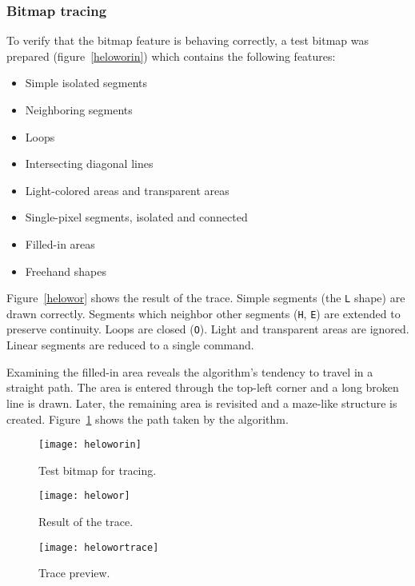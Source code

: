 \subsubsection{Bitmap tracing}

To verify that the bitmap feature is behaving correctly, a test bitmap was
prepared (figure~\ref{heloworin}) which contains the following features:
\begin{itemize}
    \item Simple isolated segments
    \item Neighboring segments
    \item Loops
    \item Intersecting diagonal lines
    \item Light-colored areas and transparent areas
    \item Single-pixel segments, isolated and connected
    \item Filled-in areas
    \item Freehand shapes
\end{itemize}
Figure~\ref{helowor} shows the result of the trace. Simple segments (the
\texttt{L} shape) are drawn correctly. Segments which neighbor other segments
(\texttt{H}, \texttt{E}) are extended to preserve continuity. Loops are closed
(\texttt{O}). Light and transparent areas are ignored. Linear segments are
reduced to a single command.

Examining the filled-in area reveals the algorithm's tendency to travel in a
straight path. The area is entered through the top-left corner and a long broken
line is drawn. Later, the remaining area is revisited and a maze-like structure
is created. Figure~\ref{helowortrace} shows the path taken by the algorithm.

\begin{figure}[ht]
    \begin{minipage}{0.5\textwidth}
        \centering
        \texttt{[image: heloworin]}
        \caption{Test bitmap for tracing.}
        \label{heloworin}
    \end{minipage}\hfill
    \begin{minipage}{0.5\textwidth}
        \centering
        \texttt{[image: helowor]}
        \caption{Result of the trace.}
        \label{helowor}
    \end{minipage}
    \begin{minipage}{0.5\textwidth}
        \centering
        \texttt{[image: helowortrace]}
        \caption{Trace preview.}
        \label{helowortrace}
    \end{minipage}
\end{figure}

